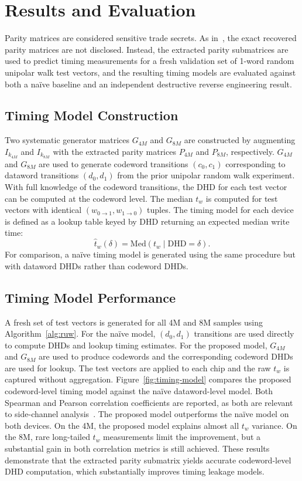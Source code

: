 \section{Results and Evaluation}
\label{sec:brewrc-results} Parity matrices are considered sensitive
trade secrets. As in~\cite{patel2020bit}, the exact recovered parity
matrices are not disclosed. Instead, the extracted parity submatrices
are used to predict timing measurements for a fresh validation set of
1-word random unipolar walk test vectors, and the resulting timing
models are evaluated against both a naïve baseline and an independent
destructive reverse engineering result.

\subsection{Timing Model Construction}
Two systematic generator matrices $G_{4M}$ and $G_{8M}$ are constructed
by augmenting $I_{k_{4M}}$ and $I_{k_{8M}}$ with the extracted parity
matrices $P_{4M}$ and $P_{8M}$, respectively. $G_{4M}$ and $G_{8M}$ are
used to generate codeword transitions $(c_0, c_1)$ corresponding to
dataword transitions $(d_0, d_1)$ from the prior unipolar random walk
experiment. With full knowledge of the codeword transitions, the DHD for
each test vector can be computed at the codeword level. The median $t_w$
is computed for test vectors with identical $(w_{0\to1}, w_{1\to0})$
tuples. The timing model for each device is defined as a lookup table
keyed by DHD returning an expected median write time:
\begin{equation}
	\label{eq:timing-model}
	\hat{t}_w(\delta) = \mathrm{Med}(t_w \mid \mathrm{DHD} = \delta).
\end{equation}
For comparison, a naïve timing model is generated using the same procedure but with dataword DHDs rather than codeword DHDs.

\subsection{Timing Model Performance}
 A
fresh set of test vectors is generated for all 4M and 8M samples using
Algorithm~\ref{alg:ruw}. For the naïve model, $(d_0, d_1)$ transitions
are used directly to compute DHDs and lookup timing estimates. For the
proposed model, $G_{4M}$ and $G_{8M}$ are used to produce codewords and
the corresponding codeword DHDs are used for lookup. The test vectors
are applied to each chip and the raw $t_w$ is captured without
aggregation. Figure~\ref{fig:timing-model} compares the proposed
codeword-level timing model against the naïve dataword-level model. Both
Spearman and Pearson correlation coefficients are reported, as both are
relevant to side-channel analysis~\cite{batina2008comparative}. The
proposed model outperforms the naïve model on both devices. On the 4M,
the proposed model explains almost all $t_w$ variance. On the 8M, rare
long-tailed $t_w$ measurements limit the improvement, but a substantial
gain in both correlation metrics is still achieved. These results
demonstrate that the extracted parity submatrix yields accurate
codeword-level DHD computation, which substantially improves timing
leakage models.

